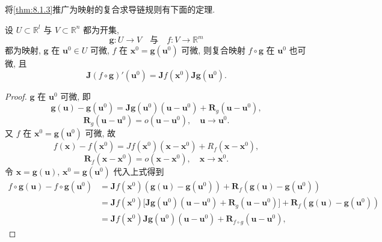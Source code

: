 将\cref{thm:8.1.3}推广为映射的复合求导链规则有下面的定理.

\begin{theorem}[映射的复合求导的链规则]\label{thm:8.2.6}
设 $U \subset \mathbb{R}^{l}$ 与 $V \subset \mathbb{R}^{n}$ 都为开集,
\[
  \boldsymbol{g}: U \to V \quad \text{与} \quad f: V \to \mathbb{R}^{m}
\]
都为映射, $\boldsymbol{g}$ 在 $\boldsymbol{u}^{0} \in U$ 可微, $f$ 在 $\boldsymbol{x}^{0} = \boldsymbol{g}(\boldsymbol{u}^{0})$ 可微, 则复合映射 $f \circ \boldsymbol{g}$ 在 $\boldsymbol{u}^{0}$ 也可微, 且
\[
  \boldsymbol{J}(f \circ \boldsymbol{g})'(\boldsymbol{u}^{0}) = \boldsymbol{J}f(\boldsymbol{x}^{0})\boldsymbol{J}\boldsymbol{g}(\boldsymbol{u}^{0}).
\]
\end{theorem}

\begin{proof}
$\boldsymbol{g}$ 在 $\boldsymbol{u}^{0}$ 可微, 即
\[
  \boldsymbol{g}(\boldsymbol{u}) - \boldsymbol{g}(\boldsymbol{u}^{0}) = \boldsymbol{J}\boldsymbol{g}(\boldsymbol{u}^{0})(\boldsymbol{u} - \boldsymbol{u}^{0}) + \boldsymbol{R}_{g}(\boldsymbol{u} - \boldsymbol{u}^{0}),
\]
\[
  \boldsymbol{R}_{g}(\boldsymbol{u} - \boldsymbol{u}^{0}) = o(\boldsymbol{u} - \boldsymbol{u}^{0}), \quad \boldsymbol{u} \to \boldsymbol{u}^{0}.
\]
又 $f$ 在 $\boldsymbol{x}^{0} = \boldsymbol{g}(\boldsymbol{u}^{0})$ 可微, 故
\[
  f(\boldsymbol{x}) - f(\boldsymbol{x}^{0}) = Jf(\boldsymbol{x}^{0})(\boldsymbol{x} - \boldsymbol{x}^{0}) + R_{f}(\boldsymbol{x} - \boldsymbol{x}^{0}),
\]
\[
  \boldsymbol{R}_{f}(\boldsymbol{x} - \boldsymbol{x}^{0}) = o(\boldsymbol{x} - \boldsymbol{x}^{0}), \quad \boldsymbol{x} \to \boldsymbol{x}^{0}.
\]
令 $\boldsymbol{x} = \boldsymbol{g}(\boldsymbol{u})$, $\boldsymbol{x}^{0} = \boldsymbol{g}(\boldsymbol{u}^{0})$ 代入上式得到
\begin{align*}
  f \circ \boldsymbol{g}(\boldsymbol{u}) - f \circ \boldsymbol{g}(\boldsymbol{u}^{0})
  &= \boldsymbol{J}f(\boldsymbol{x}^{0})(\boldsymbol{g}(\boldsymbol{u}) - \boldsymbol{g}(\boldsymbol{u}^{0})) + \boldsymbol{R}_{f}(\boldsymbol{g}(\boldsymbol{u}) - \boldsymbol{g}(\boldsymbol{u}^{0})) \\
  &= \boldsymbol{J}f(\boldsymbol{x}^{0})\big[\boldsymbol{J}\boldsymbol{g}(\boldsymbol{u}^{0})(\boldsymbol{u} - \boldsymbol{u}^{0}) + \boldsymbol{R}_{g}(\boldsymbol{u} - \boldsymbol{u}^{0})\big] + \boldsymbol{R}_{f}(\boldsymbol{g}(\boldsymbol{u}) - \boldsymbol{g}(\boldsymbol{u}^{0})) \\
  &= \boldsymbol{J}f(\boldsymbol{x}^{0})\boldsymbol{J}\boldsymbol{g}(\boldsymbol{u}^{0})(\boldsymbol{u} - \boldsymbol{u}^{0}) + \boldsymbol{R}_{f \circ g}(\boldsymbol{u} - \boldsymbol{u}^{0}),

\end{align*}
\end{proof}
